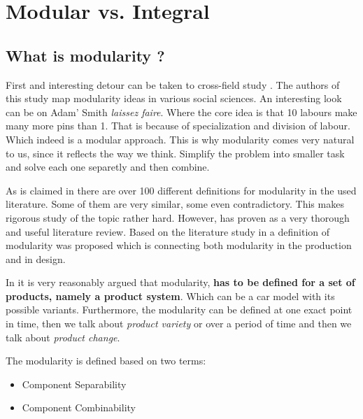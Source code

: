 \documentclass[]{scrartcl}
\begin{document}
\section{Modular vs. Integral}

\subsection{What is modularity ?}

First and interesting detour can be taken to cross-field study \cite{Li2006}. The authors of this study map modularity ideas in various social sciences. An interesting look can be on Adam' Smith \emph{laissez faire}. Where the core idea is that 10 labours make many more pins than 1. That is because of specialization and division of labour. Which indeed is a modular approach. This is why modularity comes very natural to us, since it reflects the way we think. Simplify the problem into smaller task and solve each one separetly and then combine. 

As is claimed in \cite{Salvador2007} there are over 100 different definitions for modularity in the used literature. Some of them are very similar, some even contradictory. This makes rigorous study of the topic rather hard. However, \cite{Salvador2007} has proven as a very thorough and useful literature review. Based on the literature study in \cite{Salvador2007} a definition of modularity was proposed which is connecting both modularity in the production and in design.  

In \cite{Salvador2007} it is very reasonably argued that modularity, \textbf{has to be defined for a set of products, namely a product system}. Which can be a car model with its possible variants.  Furthermore, the modularity can be defined at one exact point in time, then we talk about \emph{product variety} or over a period of time and then we talk about \emph{product change}.

The modularity is defined based on two terms:
\begin{itemize}
	\item Component Separability
	\item Component Combinability
\end{itemize}
\end{document}
